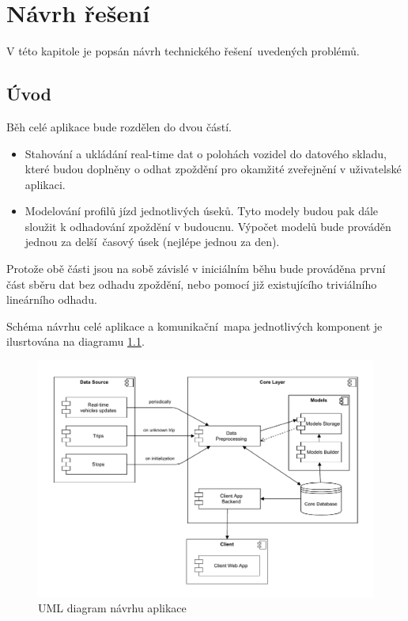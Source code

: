 
\chapter{Návrh řešení}

V této kapitole je popsán návrh technického řešení uvedených problémů.

\section{Úvod}

Běh celé aplikace bude rozdělen do dvou částí.

\begin{itemize}
	\item Stahování a ukládání real-time dat o polohách vozidel do datového skladu, které budou doplněny o odhat zpoždění pro okamžité zveřejnění v uživatelské aplikaci.

	\item Modelování profilů jízd jednotlivých úseků. Tyto modely budou pak dále sloužit k odhadování zpoždění v budoucnu.  Výpočet modelů bude prováděn jednou za delší časový úsek (nejlépe jednou za den).
\end{itemize}

Protože obě části jsou na sobě závislé v iniciálním běhu bude prováděna první část sběru dat bez odhadu zpoždění, nebo pomocí již existujícího triviálního lineárního odhadu.

\bigbreak

Schéma návrhu celé aplikace a komunikační mapa jednotlivých komponent je ilusrtována na diagramu \ref{fig:design_diagram}.

\begin{figure}
	\centering
  \includegraphics[width=\linewidth]{../img/design_diagram}
  \caption{UML diagram návrhu aplikace}
  \label{fig:design_diagram}
\end{figure}

